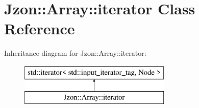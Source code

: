 \hypertarget{class_jzon_1_1_array_1_1iterator}{\section{Jzon\-:\-:Array\-:\-:iterator Class Reference}
\label{class_jzon_1_1_array_1_1iterator}
}
Inheritance diagram for Jzon\-:\-:Array\-:\-:iterator\-:\begin{figure}[H]
\begin{center}
\leavevmode
\includegraphics[height=2.000000cm]{class_jzon_1_1_array_1_1iterator}
\end{center}
\end{figure}
